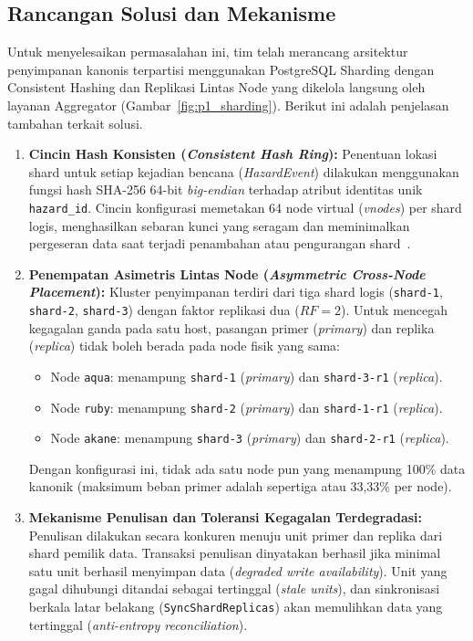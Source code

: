 \vspace{1em}

\subsection{Rancangan Solusi dan Mekanisme}
Untuk menyelesaikan permasalahan ini, tim telah merancang arsitektur penyimpanan kanonis terpartisi menggunakan PostgreSQL Sharding dengan Consistent Hashing dan Replikasi Lintas Node yang dikelola langsung oleh layanan Aggregator (Gambar~\ref{fig:p1_sharding}). Berikut ini adalah penjelasan tambahan terkait solusi.

\begin{enumerate}
    \item \textbf{Cincin Hash Konsisten (\textit{Consistent Hash Ring}):} Penentuan lokasi shard untuk setiap kejadian bencana (\textit{HazardEvent}) dilakukan menggunakan fungsi hash SHA-256 64-bit \textit{big-endian} terhadap atribut identitas unik \texttt{hazard\_id}. Cincin konfigurasi memetakan 64 node virtual (\textit{vnodes}) per shard logis, menghasilkan sebaran kunci yang seragam dan meminimalkan pergeseran data saat terjadi penambahan atau pengurangan shard~\cite{karger1997consistent}.
    \item \textbf{Penempatan Asimetris Lintas Node (\textit{Asymmetric Cross-Node Placement}):} Kluster penyimpanan terdiri dari tiga shard logis (\texttt{shard-1}, \texttt{shard-2}, \texttt{shard-3}) dengan faktor replikasi dua ($RF=2$). Untuk mencegah kegagalan ganda pada satu host, pasangan primer (\textit{primary}) dan replika (\textit{replica}) tidak boleh berada pada node fisik yang sama:
    \begin{itemize}
        \item Node \texttt{aqua}: menampung \texttt{shard-1} (\textit{primary}) dan \texttt{shard-3-r1} (\textit{replica}).
        \item Node \texttt{ruby}: menampung \texttt{shard-2} (\textit{primary}) dan \texttt{shard-1-r1} (\textit{replica}).
        \item Node \texttt{akane}: menampung \texttt{shard-3} (\textit{primary}) dan \texttt{shard-2-r1} (\textit{replica}).
    \end{itemize}
    Dengan konfigurasi ini, tidak ada satu node pun yang menampung 100\% data kanonik (maksimum beban primer adalah sepertiga atau 33,33\% per node).
    \item \textbf{Mekanisme Penulisan dan Toleransi Kegagalan Terdegradasi:} Penulisan dilakukan secara konkuren menuju unit primer dan replika dari shard pemilik data. Transaksi penulisan dinyatakan berhasil jika minimal satu unit berhasil menyimpan data (\textit{degraded write availability}). Unit yang gagal dihubungi ditandai sebagai tertinggal (\textit{stale units}), dan sinkronisasi berkala latar belakang (\texttt{SyncShardReplicas}) akan memulihkan data yang tertinggal (\textit{anti-entropy reconciliation}).

\end{enumerate}
